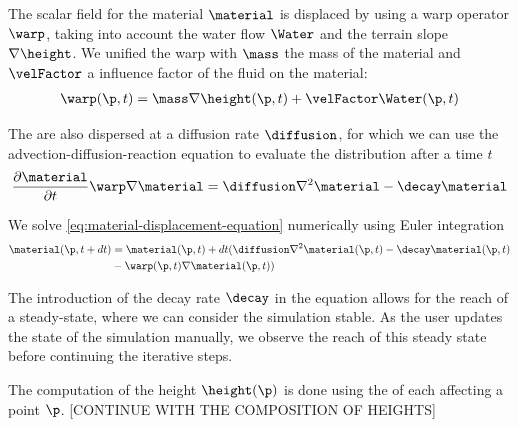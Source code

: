 The scalar field for the material $\material$ is displaced by using a warp operator $\warp$, taking into account the water flow $\Water$ and the terrain slope $\nabla \height$. We unified the warp with $\mass$ the mass of the material and $\velFactor$ a influence factor of the fluid on the material: 
\begin{align*}
    \warp(\p, t) = \mass \nabla \height(\p, t) + \velFactor \Water(\p, t)
\end{align*}
 
The  are also dispersed at a diffusion rate $\diffusion$, for which we can use the advection-diffusion-reaction equation to evaluate the distribution after a time $t$
\begin{align} 
	\label{eq:material-displacement-equation}
    \frac{\partial \material}{\partial t} \warp \nabla \material = \diffusion \nabla^2 \material - \decay \material
\end{align}

We solve \eqref{eq:material-displacement-equation} numerically using Euler integration
\begin{align}
    \material(\p, t + dt) &= \material(\p, t) + dt ( \diffusion \nabla^2 \material(\p, t) - \decay \material(\p, t) \\ & - \warp(\p, t) \nabla \material(\p, t) ) \nonumber
\end{align}

The introduction of the decay rate $\decay$ in the equation allows for the reach of a steady-state, where we can consider the simulation stable. As the user updates the state of the simulation manually, we observe the reach of this steady state before continuing the iterative steps.

The computation of the height $\height(\p)$ is done using the  of each  affecting a point $\p$.
[CONTINUE WITH THE COMPOSITION OF HEIGHTS]


